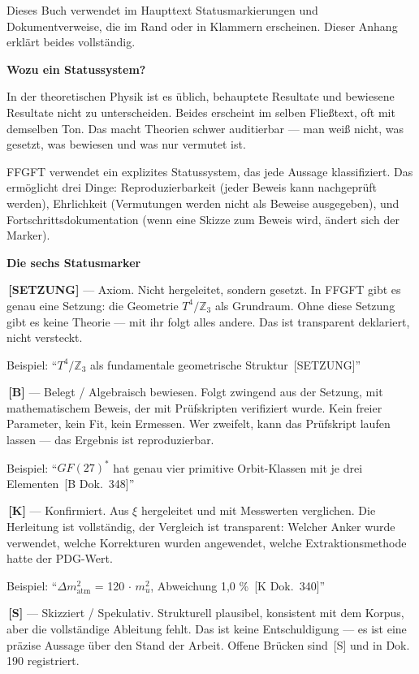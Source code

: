 \documentclass[11pt,oneside]{book}
\newcommand{\status}[1]{\penalty10000\,{\scriptsize\textcolor{gray!60}{[#1]}}}
\begin{document}
Dieses Buch verwendet im Haupttext Statusmarkierungen und Dokumentverweise,
die im Rand oder in Klammern erscheinen. Dieser Anhang erklärt beides
vollständig.


\textbf{Wozu ein Statussystem?}


In der theoretischen Physik ist es üblich, behauptete Resultate und
bewiesene Resultate nicht zu unterscheiden. Beides erscheint im selben
Fließtext, oft mit demselben Ton. Das macht Theorien schwer auditierbar —
man weiß nicht, was gesetzt, was bewiesen und was nur vermutet ist.


FFGFT verwendet ein explizites Statussystem, das jede Aussage klassifiziert.
Das ermöglicht drei Dinge: Reproduzierbarkeit (jeder Beweis kann nachgeprüft
werden), Ehrlichkeit (Vermutungen werden nicht als Beweise ausgegeben),
und Fortschrittsdokumentation (wenn eine Skizze zum Beweis wird, ändert
sich der Marker).


\textbf{Die sechs Statusmarker}


\textbf{\status{SETZUNG}} — Axiom. Nicht hergeleitet, sondern gesetzt. In FFGFT gibt
es genau eine Setzung: die Geometrie $T^4/\mathbb{Z}_3$ als Grundraum. Ohne diese
Setzung gibt es keine Theorie — mit ihr folgt alles andere. Das ist
transparent deklariert, nicht versteckt.


Beispiel: \enquote{$T^4/\mathbb{Z}_3$ als fundamentale geometrische Struktur \status{SETZUNG}}


\textbf{\status{B}} — Belegt / Algebraisch bewiesen. Folgt zwingend aus der Setzung,
mit mathematischem Beweis, der mit Prüfskripten verifiziert wurde. Kein
freier Parameter, kein Fit, kein Ermessen. Wer zweifelt, kann das
Prüfskript laufen lassen — das Ergebnis ist reproduzierbar.


Beispiel: \enquote{$GF(27)^*$ hat genau vier primitive Orbit-Klassen mit je drei
Elementen \status{B Dok.~348}}


\textbf{\status{K}} — Konfirmiert. Aus $\xi$ hergeleitet und mit Messwerten verglichen.
Die Herleitung ist vollständig, der Vergleich ist transparent: Welcher
Anker wurde verwendet, welche Korrekturen wurden angewendet, welche
Extraktionsmethode hatte der PDG-Wert.


Beispiel: \enquote{$\Delta m^2_\text{atm}$ = 120 $\cdot$ $m_
u^2$, Abweichung 1,0 \% \status{K Dok.~340}}


\textbf{\status{S}} — Skizziert / Spekulativ. Strukturell plausibel, konsistent mit
dem Korpus, aber die vollständige Ableitung fehlt. Das ist keine
Entschuldigung — es ist eine präzise Aussage über den Stand der Arbeit.
Offene Brücken sind \status{S} und in Dok. 190 registriert.
\end{document}
